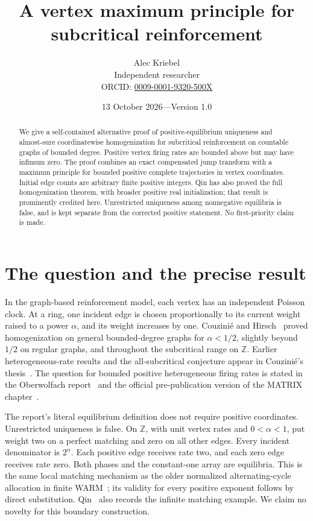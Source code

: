 \documentclass[11pt,a4paper]{article}
\title{A vertex maximum principle for subcritical reinforcement}
\author{Alec Kriebel\\\small Independent researcher\\
\small ORCID: \href{https://orcid.org/0009-0001-9320-500X}{0009-0001-9320-500X}}
\date{13 October 2026\quad---\quad Version 1.0}
\begin{document}
\maketitle
\begin{abstract}
We give a self-contained alternative proof of positive-equilibrium uniqueness
and almost-sure coordinatewise homogenization for subcritical reinforcement on
countable graphs of bounded degree. Positive vertex firing rates are bounded
above but may have infimum zero. The proof combines an exact compensated jump
transform with a maximum principle for bounded positive complete trajectories
in vertex coordinates. Initial edge counts are arbitrary finite positive
integers. Qin has also proved the full homogenization theorem, with broader
positive real initialization; that result is prominently credited here.
Unrestricted uniqueness among nonnegative equilibria is false, and is kept
separate from the corrected positive statement. No first-priority claim is made.
\end{abstract}

\section{The question and the precise result}

In the graph-based reinforcement model, each vertex has an independent
Poisson clock. At a ring, one incident edge is chosen proportionally to its
current weight raised to a power $\alpha$, and its weight increases by one.
Couzini\'e and Hirsch~\cite{CH} proved homogenization on general bounded-degree
graphs for $\alpha<1/2$, slightly beyond $1/2$ on regular graphs, and throughout
the subcritical range on $\mathbb Z$. Earlier heterogeneous-rate results and
the all-subcritical conjecture appear in Couzini\'e's thesis~\cite{thesis}.
The question for bounded positive heterogeneous firing rates is stated in the
Oberwolfach report~\cite{OWR} and the official pre-publication version of the
MATRIX chapter~\cite{MATRIX}.

The report's literal equilibrium definition does not require positive
coordinates. Unrestricted uniqueness is false. On $\mathbb Z$, with unit
vertex rates and $0<\alpha<1$, put weight two on a perfect matching and zero
on all other edges. Every incident denominator is $2^\alpha$. Each positive
edge receives rate two, and each zero edge receives rate zero. Both phases
and the constant-one array are equilibria. This is the same local matching
mechanism as the older normalized alternating-cycle allocation in finite
WARM~\cite[\S3.6]{WARM}; its validity for every positive exponent follows by
direct substitution. Qin~\cite[Remark 1.3]{Qin} also records the infinite
matching example. We claim no novelty for this boundary construction.
\end{document}
